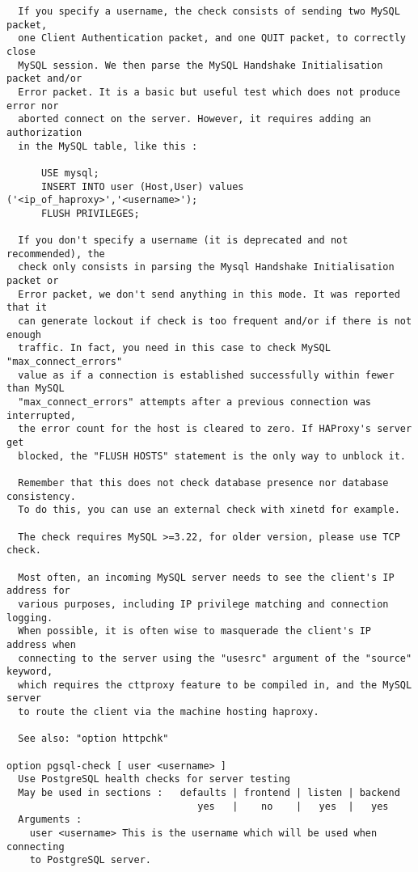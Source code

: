 \begin{verbatim}
  If you specify a username, the check consists of sending two MySQL packet,
  one Client Authentication packet, and one QUIT packet, to correctly close
  MySQL session. We then parse the MySQL Handshake Initialisation packet and/or
  Error packet. It is a basic but useful test which does not produce error nor
  aborted connect on the server. However, it requires adding an authorization
  in the MySQL table, like this :

      USE mysql;
      INSERT INTO user (Host,User) values ('<ip_of_haproxy>','<username>');
      FLUSH PRIVILEGES;

  If you don't specify a username (it is deprecated and not recommended), the
  check only consists in parsing the Mysql Handshake Initialisation packet or
  Error packet, we don't send anything in this mode. It was reported that it
  can generate lockout if check is too frequent and/or if there is not enough
  traffic. In fact, you need in this case to check MySQL "max_connect_errors"
  value as if a connection is established successfully within fewer than MySQL
  "max_connect_errors" attempts after a previous connection was interrupted,
  the error count for the host is cleared to zero. If HAProxy's server get
  blocked, the "FLUSH HOSTS" statement is the only way to unblock it.

  Remember that this does not check database presence nor database consistency.
  To do this, you can use an external check with xinetd for example.

  The check requires MySQL >=3.22, for older version, please use TCP check.

  Most often, an incoming MySQL server needs to see the client's IP address for
  various purposes, including IP privilege matching and connection logging.
  When possible, it is often wise to masquerade the client's IP address when
  connecting to the server using the "usesrc" argument of the "source" keyword,
  which requires the cttproxy feature to be compiled in, and the MySQL server
  to route the client via the machine hosting haproxy.

  See also: "option httpchk"

option pgsql-check [ user <username> ]
  Use PostgreSQL health checks for server testing
  May be used in sections :   defaults | frontend | listen | backend
                                 yes   |    no    |   yes  |   yes
  Arguments :
    user <username> This is the username which will be used when connecting
    to PostgreSQL server.


\end{verbatim}
